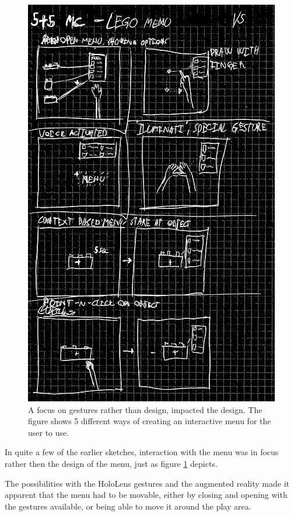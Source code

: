 \begin{figure}[t]
	\centering
	\includegraphics[width=0.7\linewidth]{figures/Menu/menu5}
	\caption{A focus on gestures rather than design, impacted the design. The figure shows 5 different ways of creating an interactive menu for the user to use.}
	\label{fig:menugesture}
\end{figure}
In quite a few of the earlier sketches, interaction with the menu was in focus rather then the design of the menu, just as figure \ref{fig:menugesture} depicts.\par
The possibilities with the HoloLens gestures and the augmented reality made it apparent that the menu had to be movable, either by closing and opening with the gestures available, or being able to move it around the play area. 

